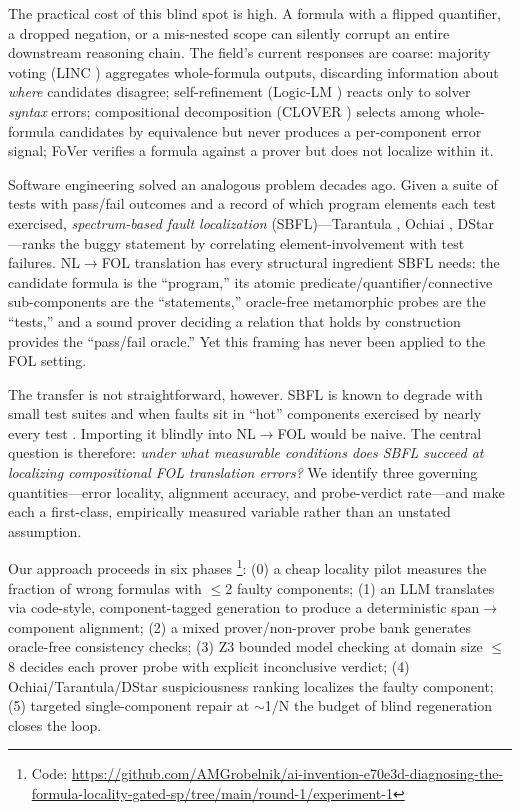 \documentclass[11pt,letterpaper]{article}
\begin{document}
The practical cost of this blind spot is high. A formula with a flipped quantifier, a dropped negation, or a mis-nested scope can silently corrupt an entire downstream reasoning chain. The field's current responses are coarse: majority voting (LINC \citep{Olausson2023}) aggregates whole-formula outputs, discarding information about \emph{where} candidates disagree; self-refinement (Logic-LM \citep{Pan2023}) reacts only to solver \emph{syntax} errors; compositional decomposition (CLOVER \citep{Ryu2025}) selects among whole-formula candidates by equivalence but never produces a per-component error signal; FoVer \citep{Pei2025} verifies a formula against a prover but does not localize within it.

Software engineering solved an analogous problem decades ago. Given a suite of tests with pass/fail outcomes and a record of which program elements each test exercised, \emph{spectrum-based fault localization} (SBFL)—Tarantula \citep{Jones2005}, Ochiai \citep{Abreu2007}, DStar \citep{Wong2014}—ranks the buggy statement by correlating element-involvement with test failures. NL$\to$FOL translation has every structural ingredient SBFL needs: the candidate formula is the ``program,'' its atomic predicate/quantifier/connective sub-components are the ``statements,'' oracle-free metamorphic probes are the ``tests,'' and a sound prover deciding a relation that holds by construction provides the ``pass/fail oracle.'' Yet this framing has never been applied to the FOL setting.

The transfer is not straightforward, however. SBFL is known to degrade with small test suites and when faults sit in ``hot'' components exercised by nearly every test \citep{Jones2005,Abreu2007}. Importing it blindly into NL$\to$FOL would be naive. The central question is therefore: \emph{under what measurable conditions does SBFL succeed at localizing compositional FOL translation errors?} We identify three governing quantities—error locality, alignment accuracy, and probe-verdict rate—and make each a first-class, empirically measured variable rather than an unstated assumption.

Our approach proceeds in six phases%
\footnote{Code: \url{https://github.com/AMGrobelnik/ai-invention-e70e3d-diagnosing-the-formula-locality-gated-sp/tree/main/round-1/experiment-1}}:
(0) a cheap locality pilot measures the fraction of wrong formulas with $\leq$2 faulty components; (1) an LLM translates via code-style, component-tagged generation to produce a deterministic span$\to$component alignment; (2) a mixed prover/non-prover probe bank generates oracle-free consistency checks; (3) Z3 bounded model checking at domain size $\leq$8 decides each prover probe with explicit inconclusive verdict; (4) Ochiai/Tarantula/DStar suspiciousness ranking localizes the faulty component; (5) targeted single-component repair at $\sim$1/N the budget of blind regeneration closes the loop.
\end{document}
